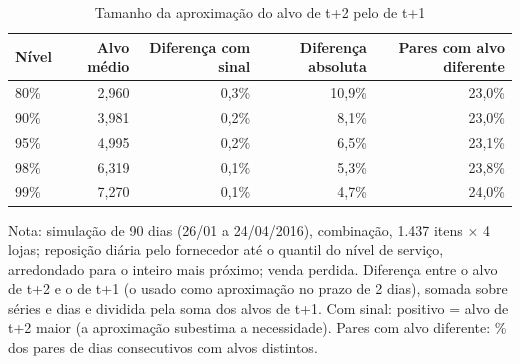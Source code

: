 \begin{table}[htbp]
\centering
\small
\caption{Tamanho da aproximação do alvo de t+2 pelo de t+1}
\label{tab:tb_aproximacao_alvo}
\begin{tabular}{lrrrr}
\toprule
Nível & Alvo médio & Diferença com sinal & Diferença absoluta & Pares com alvo diferente \\
\midrule
80\% & 2,960 & 0,3\% & 10,9\% & 23,0\% \\
90\% & 3,981 & 0,2\% & 8,1\% & 23,0\% \\
95\% & 4,995 & 0,2\% & 6,5\% & 23,1\% \\
98\% & 6,319 & 0,1\% & 5,3\% & 23,8\% \\
99\% & 7,270 & 0,1\% & 4,7\% & 24,0\% \\
\bottomrule
\end{tabular}
\par\smallskip
{\footnotesize Nota: simulação de 90 dias (26/01 a 24/04/2016), combinação, 1.437 itens × 4 lojas; reposição diária pelo fornecedor até o quantil do nível de serviço, arredondado para o inteiro mais próximo; venda perdida. Diferença entre o alvo de t+2 e o de t+1 (o usado como aproximação no prazo de 2 dias), somada sobre séries e dias e dividida pela soma dos alvos de t+1. Com sinal: positivo = alvo de t+2 maior (a aproximação subestima a necessidade). Pares com alvo diferente: \% dos pares de dias consecutivos com alvos distintos.}
\end{table}
